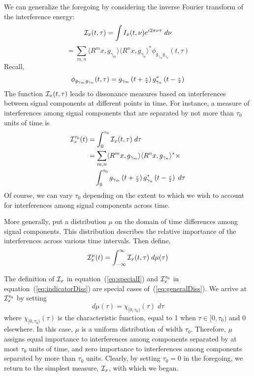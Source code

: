 We can generalize the foregoing by considering the inverse Fourier transform
of the interference energy:
\[  
\mathcal{I}_x(t,\tau) = \int I_x(t,\nu)e^{i2\pi\nu\tau}\; d\nu  
\]
\[
= \sum_{m, n}\langle R^mx,g_{\gamma_m}\rangle \langle R^nx,g_{\gamma_n}\rangle^* 
\phi_{g_{\gamma_m}g_{\gamma_n}}(t,\tau)
\]
Recall,
\[
\phi_{g_{\gamma_m}g_{\gamma_n}}(t,\tau) 
= g_{\gamma_m}\left(t+{\scriptstyle \frac{\tau}{2}}\right) g^*_{\gamma_n}\left(t-{\scriptstyle \frac{\tau}{2}}\right)
\]
The function $\mathcal{I}_x(t,\tau)$ leads to dissonance measures based on interferences
between signal components at different points in time.  For instance, a measure
of interferences among signal components that are separated by not more than 
$\tau_0$ units of time is
\begin{align}\label{eq:indicatorDiss}
\mathcal{I}_x^{\tau_0}(t) &= \int_0^{\tau_0} \mathcal{I}_x(t,\tau)\; d\tau\\
&=\sum_{m, n} \langle R^mx,g_{\gamma_m}\rangle \langle
                      R^nx,g_{\gamma_n}\rangle^* \times \nonumber\\
&\quad \int_0^{\tau_0} g_{\gamma_m}\left(t+{\scriptstyle \frac{\tau}{2}}\right) g^*_{\gamma_n}\left(t-{\scriptstyle \frac{\tau}{2}}\right)\;d\tau\nonumber
\end{align}
Of course, we can vary $\tau_0$ depending on the extent to which we wish to
account for interferences among signal components across time. 

More generally, put a distribution $\mu$ on the domain of time differences
among signal components.  This distribution describes the
relative importance of the interferences across various time intervals.  Then define,
\begin{equation}\label{eq:generalDiss}
\mathcal{I}_x^{\mu}(t) = \int_{-\infty}^{\infty} \mathcal{I}_x(t,\tau)\; d\mu(\tau)
\end{equation}

The definition of $\mathcal{I}_x$ in equation~(\ref{eq:specialI}) and $\mathcal{I}_x^{\tau_0}$
in equation~(\ref{eq:indicatorDiss}) are special cases
of~(\ref{eq:generalDiss}). We arrive at $\mathcal{I}_x^{\tau_0}$ by setting
\[
d\mu(\tau) = \chi_{[0,\tau_0)}(\tau)\;d\tau
\]
where $\chi_{[0,\tau_0)}(\tau)$ is the characteristic function, equal to 1 when
$\tau \in [0,\tau_0)$ and 0 elsewhere. In this case, $\mu$ is a uniform
distribution of width $\tau_0$.  Therefore, $\mu$ assigns equal importance to
interferences among components separated by at most $\tau_0$ units of time,
and zero importance to interferences among components separated by more than
$\tau_0$ units. Clearly, by setting $\tau_0 = 0$ in the foregoing, we
  return to the simplest measure, $\mathcal{I}_x$, with which we began.

